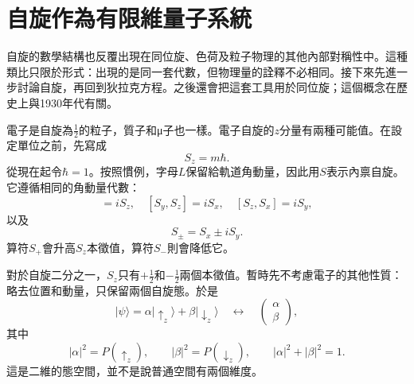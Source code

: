 \begin{classroomqa}
\end{classroomqa}

\section{自旋作為有限維量子系統}

自旋的數學結構也反覆出現在同位旋、色荷及粒子物理的其他內部對稱性中。這種類比只限於形式：出現的是同一套代數，但物理量的詮釋不必相同。接下來先進一步討論自旋，再回到狄拉克方程。之後還會把這套工具用於同位旋；這個概念在歷史上與1930年代有關。

電子是自旋為\(\tfrac12\)的粒子，質子和{\proseunicodefont μ}子也一樣。電子自旋的\(z\)分量有兩種可能值。在設定單位之前，先寫成
\begin{equation}
S_z=m\hbar.
\end{equation}
從現在起令\(\hbar=1\)。按照慣例，字母\(L\)保留給軌道角動量，因此用\(S\)表示內禀自旋。它遵循相同的角動量代數：
\begin{equation}
[S_x,S_y]=iS_z,
\quad
[S_y,S_z]=iS_x,
\quad
[S_z,S_x]=iS_y,
\end{equation}
以及
\begin{equation}
S_\pm=S_x\pm iS_y.
\end{equation}
算符\(S_+\)會升高\(S_z\)本徵值，算符\(S_-\)則會降低它。

\begin{classroomqa}
\end{classroomqa}

對於自旋二分之一，\(S_z\)只有\(+\tfrac12\)和\(-\tfrac12\)兩個本徵值。暫時先不考慮電子的其他性質：略去位置和動量，只保留兩個自旋態。於是
\begin{equation}
|\psi\rangle
=
\alpha|\uparrow_z\rangle+\beta|\downarrow_z\rangle
\quad\longleftrightarrow\quad
\begin{pmatrix}
\alpha\\
\beta
\end{pmatrix},
\end{equation}
其中
\begin{equation}
|\alpha|^2=P(\uparrow_z),
\qquad
|\beta|^2=P(\downarrow_z),
\qquad
|\alpha|^2+|\beta|^2=1.
\end{equation}
這是二維的態空間，並不是說普通空間有兩個維度。

